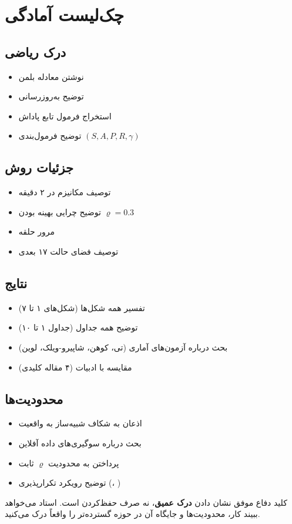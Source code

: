 \documentclass[oneside,openany,a4paper,12pt]{article}
\newcommand{\rsdrl}{\lr{RS-DRL}}
\newcommand{\mapek}{\lr{MAPE-K}}
\begin{document}
\section{چک‌لیست آمادگی}

\subsection*{درک ریاضی}
\begin{itemize}[label=$\square$]
  \item نوشتن معادله بلمن
  \item توضیح به‌روزرسانی 
  \item استخراج فرمول تابع پاداش
  \item توضیح فرمول‌بندی  $(S, A, P, R, \gamma)$
\end{itemize}

\subsection*{جزئیات روش}
\begin{itemize}[label=$\square$]
  \item توصیف مکانیزم \rsdrl{} در ۲ دقیقه
  \item توضیح چرایی بهینه بودن $\varrho=0.3$
  \item مرور حلقه \mapek{}
  \item توصیف فضای حالت ۱۷ بعدی
\end{itemize}

\subsection*{نتایج}
\begin{itemize}[label=$\square$]
  \item تفسیر همه شکل‌ها (شکل‌های ۱ تا ۷)
  \item توضیح همه جداول (جداول ۱ تا ۱۰)
  \item بحث درباره آزمون‌های آماری (تی، کوهن، شاپیرو-ویلک، لوین)
  \item مقایسه با ادبیات (۴ مقاله کلیدی)
\end{itemize}

\subsection*{محدودیت‌ها}
\begin{itemize}[label=$\square$]
  \item اذعان به شکاف شبیه‌ساز به واقعیت
  \item بحث درباره سوگیری‌های داده آفلاین
  \item پرداختن به محدودیت $\varrho$ ثابت
  \item توضیح رویکرد تکرارپذیری (، )
\end{itemize}

\bigskip
\begin{tcolorbox}[colback=fixbg, colframe=fixborder, title=\textbf{موفق باشید!}]
کلید دفاع موفق نشان دادن \textbf{درک عمیق}، نه صرف حفظ‌کردن است. استاد می‌خواهد ببیند کار، محدودیت‌ها و جایگاه آن در حوزه گسترده‌تر را واقعاً درک می‌کنید.
\end{tcolorbox}
\end{document}
